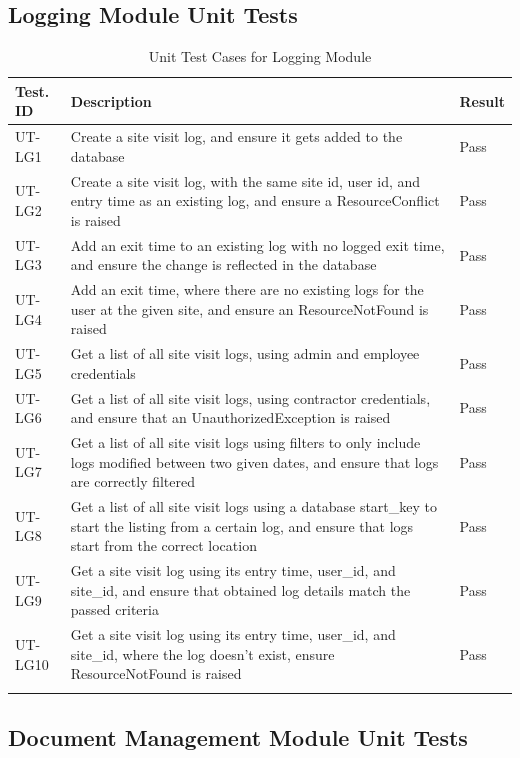 \documentclass[12pt, titlepage]{article}
\begin{document}
\subsection{Logging Module Unit Tests}

\begin{longtable}{|m{2cm}|m{10cm}|m{1.4cm}|}
  \hline
  \textbf{Test. ID} & \textbf{Description} & \textbf{Result} \\ \hline
  UT-LG1 & Create a site visit log, and ensure it gets added to the
  database & Pass\\ \hline
  UT-LG2 & Create a site visit log, with the same site id, user id,
  and entry time as an existing log, and ensure a ResourceConflict is
  raised & Pass\\ \hline
  UT-LG3 & Add an exit time to an existing log with no logged exit
  time, and ensure the change is reflected in the database & Pass\\ \hline
  UT-LG4 & Add an exit time, where there are no existing logs for
  the user at the given site, and ensure an ResourceNotFound is
  raised & Pass\\ \hline
  UT-LG5 & Get a list of all site visit logs, using admin and
  employee credentials & Pass\\ \hline
  UT-LG6 & Get a list of all site visit logs, using contractor
  credentials, and ensure that an UnauthorizedException is raised &
  Pass\\ \hline
  UT-LG7 & Get a list of all site visit logs using filters to only
  include logs modified between two given dates, and ensure that logs
  are correctly filtered & Pass\\ \hline
  UT-LG8 & Get a list of all site visit logs using a database
  start\_key to start the listing from a certain log, and ensure that
  logs start from the correct location & Pass\\ \hline
  UT-LG9 & Get a site visit log using its entry time, user\_id, and
  site\_id, and ensure that obtained log details match the passed
  criteria & Pass\\ \hline
  UT-LG10 & Get a site visit log using its entry time, user\_id, and
  site\_id, where the log doesn't exist, ensure ResourceNotFound is
  raised & Pass\\ \hline
  \caption{Unit Test Cases for Logging Module}
\end{longtable}

\subsection{Document Management Module Unit Tests}
\end{document}

